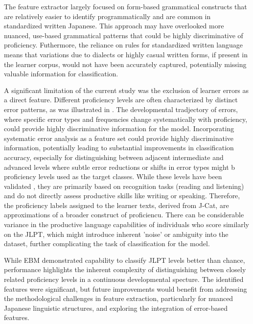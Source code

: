 The feature extractor largely focused on form-based grammatical constructs that are relatively easier to identify
programmatically and are common in standardized written Japanese. This approach may have overlooked more nuanced,
use-based grammatical patterns that could be highly discriminative of proficiency. Futhermore, the reliance on rules
for standardized written language means that variations due to dialects or highly casual written forms, if present
in the learner corpus, would not have been accurately captured, potentially missing valuable information for
classification.

A significant limitation of the current study was the exclusion of learner errors as a direct feature. Different
proficiency levels are often
characterized by distinct error patterns, as was illustrated in \citet{Hawkins_Buttery_2010}.  The
developmental tradjectory of errors, where specific error types and frequencies change systematically with
proficiency, could provide highly discriminative information for the model.
Incorporating
systematic error analysis as a
feature
set
could provide
highly discriminative information, potentially leading to substantial improvements in classification accuracy,
especially for distinguishing between adjacent intermediate and advanced levels where subtle error reductions or
shifts in error types might b proficiency levels used as the target classes. While these levels have been validated \citet{jcat_interpretation_guide}, they are primarily based on recognition tasks (reading and listening) and do not directly assess productive skills like writing or speaking. Therefore, the proficiency labels assigned to the learner texts, derived from J-Cat, are approximations of a broader construct of proficiencu. There can be considerable variance in the productive language capabilities of individuals who score similarly on the JLPT, which might introduce inherent 'noise' or ambiguity into the dataset, further complicating the task of classification for the model.

While EBM demonstrated capability to classify JLPT levels better than chance, performance highlights the inherent
complexity of distinguishing between closely related proficiency levels in a continuous developmental specture. The
identified features were significant, but future improvements would benefit from addressing the methodological
challenges in feature extraction, particularly for nuanced Japanese linguistic structures, and exploring the
integration of error-based features.